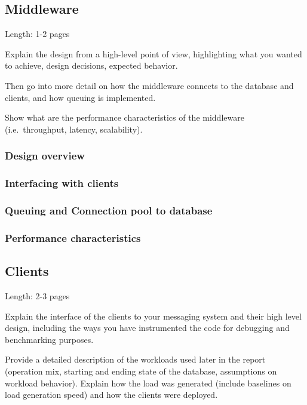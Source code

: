 \documentclass[11pt]{article}
\begin{document}
\subsection{Middleware}\label{sec:middleware}

Length: 1-2 pages

Explain the design from a high-level point of view, highlighting what
you wanted to achieve, design decisions, expected behavior.

Then go into more detail on how the middleware connects to the database
and clients, and how queuing is implemented.

Show what are the performance characteristics of the middleware
(i.e.~throughput, latency, scalability).

\subsubsection{Design overview}\label{sec:design-overview}

\subsubsection{Interfacing with clients}\label{sec:interfacing-with-clients}

\subsubsection{Queuing and Connection pool to database}\label{sec:queuing-and-connection-pool-to-database}

\subsubsection{Performance characteristics}\label{sec:performance-characteristics-1}

\subsection{Clients}\label{sec:clients}

Length: 2-3 pages

Explain the interface of the clients to your messaging system and their
high level design, including the ways you have instrumented the code for
debugging and benchmarking purposes.

Provide a detailed description of the workloads used later in the report
(operation mix, starting and ending state of the database, assumptions
on workload behavior). Explain how the load was generated (include
baselines on load generation speed) and how the clients were deployed.
\end{document}

